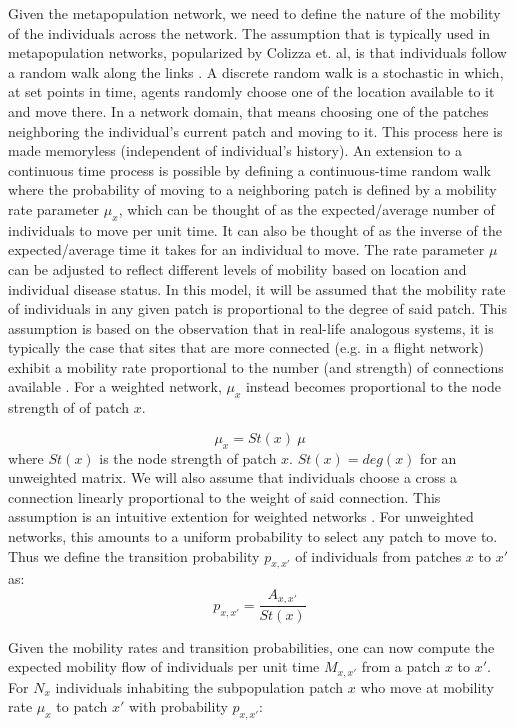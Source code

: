 Given the metapopulation network, we need to define the nature of the mobility of the individuals across the network. The assumption that is typically used in metapopulation networks, popularized by Colizza et. al, is that individuals follow a random walk along the links \cite{colizza2008epidemic}. A discrete random walk is a stochastic in which, at set points in time, agents randomly choose one of the location available to it and move there. In a network domain, that means choosing one of the patches neighboring the individual's current patch and moving to it. This process here is made memoryless (independent of individual's history). An extension to a continuous time process is possible by defining a continuous-time random walk where the probability of moving to a neighboring patch is defined by a mobility rate parameter $\mu_x$, which can be thought of as the expected/average number of individuals to move per unit time. It can also be thought of as the inverse of the expected/average time it takes for an individual to move. The rate parameter $\mu$ can be adjusted to reflect different levels of mobility based on location and individual disease status. In this model, it will be assumed that the mobility rate of individuals in any given patch is proportional to the degree of said patch. This assumption is based on the observation that in real-life analogous systems, it is typically the case that sites that are more connected (e.g. in a flight network) exhibit a mobility rate proportional to the number (and strength) of connections available \cite{colizza2006role}. For a weighted network, $\mu_x$ instead becomes proportional to the node strength of of patch $x$.

\begin{equation}
    \mu_x= St(x) \ \mu
\end{equation}
where $St(x)$ is the node strength of patch $x$. $St(x)=deg(x)$ for an unweighted matrix. We will also assume that individuals choose a cross a connection linearly proportional to the weight of said connection. This assumption is an intuitive extention for weighted networks \cite{10.1093/comnet/cnab032}. For unweighted networks, this amounts to a uniform probability to select any patch to move to. Thus we define the transition probability $p_{x,x'}$ of individuals from patches $x$ to $x'$ as:
\begin{equation}
    p_{x,x'} =  \frac{A_{x,x'}}{St(x)}
\end{equation}

Given the mobility rates and transition probabilities, one can now compute the expected mobility flow of individuals per unit time $M_{x,x'}$ from a patch $x$ to $x'$. For $N_x$ individuals inhabiting the subpopulation patch $x$ who move at mobility rate $\mu_x$ to patch $x'$ with probability $p_{x,x'}$:

